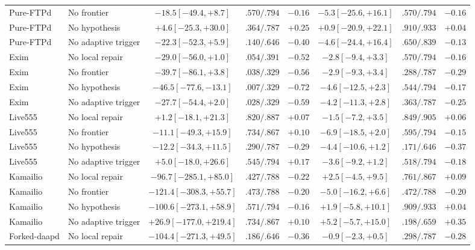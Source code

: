 \documentclass[final,5p,times,number]{elsarticle}
\begin{document}
\begin{table}[!t]
{{\begin{tabular}{l l c c c c c c}
Pure-FTPd & No frontier & $-18.5 [-49.4,+8.7]$ & $.570/.794$ & $-0.16$ & $-5.3 [-25.6,+16.1]$ & $.570/.794$ & $-0.16$ \\
Pure-FTPd & No hypothesis & $+4.6 [-25.3,+30.0]$ & $.364/.787$ & $+0.25$ & $+0.9 [-20.9,+22.1]$ & $.910/.933$ & $+0.04$ \\
Pure-FTPd & No adaptive trigger & $-22.3 [-52.3,+5.9]$ & $.140/.646$ & $-0.40$ & $-4.6 [-24.4,+16.4]$ & $.650/.839$ & $-0.13$ \\
Exim & No local repair & $-29.0 [-56.0,+1.0]$ & $.054/.391$ & $-0.52$ & $-2.8 [-9.4,+3.3]$ & $.570/.794$ & $-0.16$ \\
Exim & No frontier & $-39.7 [-86.1,+3.8]$ & $.038/.329$ & $-0.56$ & $-2.9 [-9.3,+3.4]$ & $.288/.787$ & $-0.29$ \\
Exim & No hypothesis & $-46.5 [-77.6,-13.1]$ & $.007/.329$ & $-0.72$ & $-4.6 [-12.5,+2.3]$ & $.544/.794$ & $-0.17$ \\
Exim & No adaptive trigger & $-27.7 [-54.4,+2.0]$ & $.028/.329$ & $-0.59$ & $-4.2 [-11.3,+2.8]$ & $.363/.787$ & $-0.25$ \\
Live555 & No local repair & $+1.2 [-18.1,+21.3]$ & $.820/.887$ & $+0.07$ & $-1.5 [-7.2,+3.5]$ & $.849/.905$ & $+0.06$ \\
Live555 & No frontier & $-11.1 [-49.3,+15.9]$ & $.734/.867$ & $+0.10$ & $-6.9 [-18.5,+2.0]$ & $.595/.794$ & $-0.15$ \\
Live555 & No hypothesis & $-12.2 [-34.3,+11.5]$ & $.290/.787$ & $-0.29$ & $-4.4 [-10.6,+1.2]$ & $.171/.646$ & $-0.37$ \\
Live555 & No adaptive trigger & $+5.0 [-18.0,+26.6]$ & $.545/.794$ & $+0.17$ & $-3.6 [-9.2,+1.2]$ & $.518/.794$ & $-0.18$ \\
Kamailio & No local repair & $-96.7 [-285.1,+85.0]$ & $.427/.788$ & $-0.22$ & $+2.5 [-4.5,+9.5]$ & $.761/.867$ & $+0.09$ \\
Kamailio & No frontier & $-121.4 [-308.3,+55.7]$ & $.473/.788$ & $-0.20$ & $-5.0 [-16.2,+6.6]$ & $.472/.788$ & $-0.20$ \\
Kamailio & No hypothesis & $-100.6 [-273.1,+58.9]$ & $.571/.794$ & $-0.16$ & $+1.9 [-5.8,+10.1]$ & $.909/.933$ & $+0.04$ \\
Kamailio & No adaptive trigger & $+26.9 [-177.0,+219.4]$ & $.734/.867$ & $+0.10$ & $+5.2 [-5.7,+15.0]$ & $.198/.659$ & $+0.35$ \\
Forked-daapd & No local repair & $-104.4 [-271.3,+49.5]$ & $.186/.646$ & $-0.36$ & $-0.9 [-2.3,+0.5]$ & $.298/.787$ & $-0.28$ \\

\end{tabular}}}
\end{table}
\end{document}
